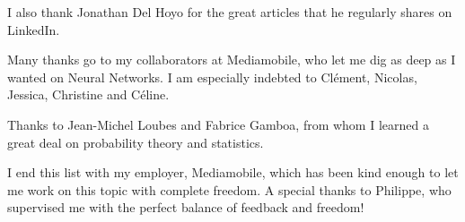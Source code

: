 I also thank Jonathan Del Hoyo for the great articles that he regularly shares on LinkedIn.

\vspace{0.2cm}

Many thanks go to my collaborators at Mediamobile, who let me dig as deep as I wanted on Neural Networks. I am especially indebted to Clément, Nicolas, Jessica, Christine and Céline. 

\vspace{0.2cm}

Thanks to Jean-Michel Loubes and Fabrice Gamboa, from whom I learned a great deal on probability theory and statistics.

\vspace{0.2cm}

I end this list with my employer, Mediamobile, which has been kind enough to let me work on this topic with complete freedom. A special thanks to Philippe, who supervised me with the perfect balance of feedback and freedom! 

